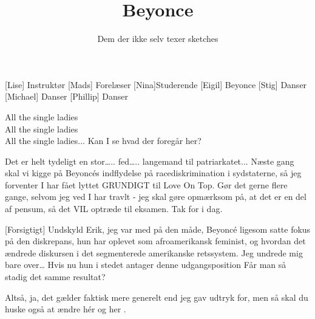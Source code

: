 \documentclass[a4paper,11pt]{article}
\title{Beyonce}
\author{Dem der ikke selv texer sketches}
\begin{document}
\maketitle

\begin{roles}
[Lise] Instruktør
[Mads] Forelæser
[Nina]Studerende  
[Eigil] Beyonce
[Stig] Danser
[Michael] Danser
[Phillip] Danser
\end{roles}

\begin{props}
\end{props}


\begin{sketch}

 All the single ladies\\
All the single ladies\\
All the single ladies...
 Kan I se hvad der foregår her?


 Det er helt tydeligt en stor….. fed…..  langemand til patriarkatet... Næste gang skal vi kigge på Beyoncés indflydelse på racediskrimination i sydstaterne, så jeg forventer I har fået lyttet GRUNDIGT til Love On Top. Gør det gerne flere gange, selvom jeg ved I har travlt - jeg skal gøre opmærksom på, at det er en del af pensum, så det VIL optræde til eksamen. Tak for i dag.


[Forsigtigt] Undskyld Erik, jeg var med på den måde, Beyoncé ligesom satte fokus på den diskrepans, hun har oplevet som afroamerikansk feminist, og hvordan det ændrede diskursen i det segmenterede amerikanske retssystem. Jeg undrede mig bare over… Hvis nu hun i stedet antager denne udgangsposition  Får man så stadig det samme resultat?

 Altså, ja, det gælder faktisk mere generelt end jeg gav udtryk for, men så skal du huske også at ændre hér  og her .


\end{sketch}
\end{document}
